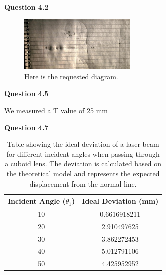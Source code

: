 \documentclass[a4paper,12pt]{article}
\begin{document}
\vspace{1cm}

\noindent \textbf{\LARGE Question 4.2}

\vspace{0.2cm}

\begin{figure}[htbp]
    \centering
    \includegraphics[width=0.5\textwidth]{fifth_diagram_lab1_PHY_192.png}
    \caption{Here is the requested diagram.} 
\end{figure}

\vspace{0.2cm}

\noindent \textbf{\LARGE Question 4.5}

\vspace{0.2cm}

We measured a T value of 25 mm

\vspace{0.2cm}

\noindent \textbf{\LARGE Question 4.7}

\vspace{0.2cm}

\begin{table}[h]
    \centering
    \begin{tabular}{cc}
        \toprule
        Incident Angle ($\theta_1$) & Ideal Deviation (mm) \\
        \midrule
        10 & 0.6616918211 \\
        20 & 2.910497625 \\
        30 & 3.862272453 \\
        40 & 5.012791106 \\
        50 & 4.425952952 \\
        \bottomrule
    \end{tabular}
    \caption{Table showing the ideal deviation of a laser beam for different incident angles when passing through a cuboid lens. The deviation is calculated based on the theoretical model and represents the expected displacement from the normal line.}
    \label{tab:ideal_deviation}
\end{table}

\vspace{0.2cm}
\end{document}
